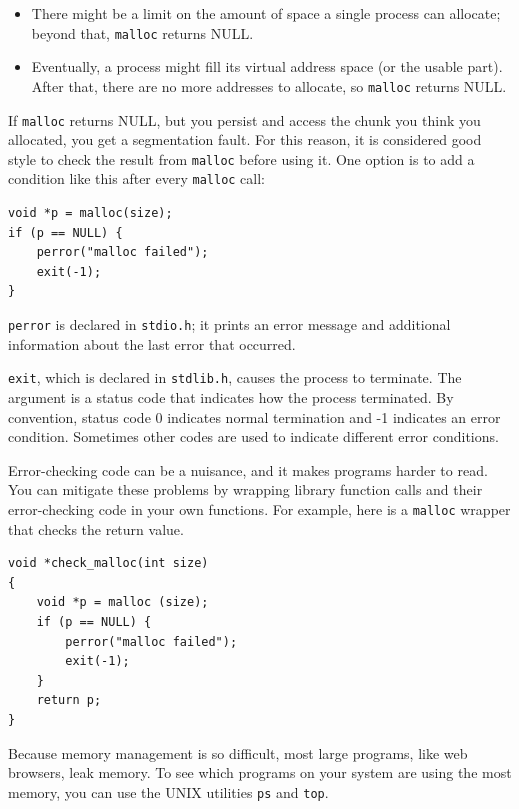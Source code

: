 \documentclass[12pt]{book}
\begin{document}
{\begin{itemize}
\item There might be a limit on the amount of space a single
  process can allocate; beyond that, {\tt malloc} returns NULL.

\item Eventually, a process might fill its virtual address space (or
  the usable part).  After that, there are no more addresses to
  allocate, so {\tt malloc} returns NULL.

\end{itemize}

If {\tt malloc} returns NULL, but you persist and access
the chunk you think you allocated, you get a segmentation fault.
For this reason, it is considered good style to check the result from
{\tt malloc} before using it.  One option is to add a condition like
this after every {\tt malloc} call:

\begin{verbatim}
void *p = malloc(size);
if (p == NULL) {
    perror("malloc failed");
    exit(-1);
}
\end{verbatim}

{\tt perror} is declared in {\tt stdio.h}; it prints
an error message and additional information about the last error
that occurred.

{\tt exit}, which is declared in {\tt stdlib.h}, causes the process
to terminate.  The argument is a status code that indicates how
the process terminated.  By convention, status code 0 indicates normal
termination and -1 indicates an error condition.  Sometimes other
codes are used to indicate different error conditions.

Error-checking code can be a nuisance, and it makes programs
harder to read.  You can mitigate these problems by wrapping library
function calls and their error-checking code in your own
functions.  For example, here is a {\tt malloc} wrapper that checks
the return value.

\begin{verbatim}
void *check_malloc(int size)
{
    void *p = malloc (size);
    if (p == NULL) {
        perror("malloc failed");
        exit(-1);
    }
    return p;
}
\end{verbatim}

Because memory management is so difficult, most large programs, like
web browsers, leak memory.  To see which programs on your system are
using the most memory, you can use the UNIX utilities {\tt ps} and
{\tt top}.




}
\end{document}
